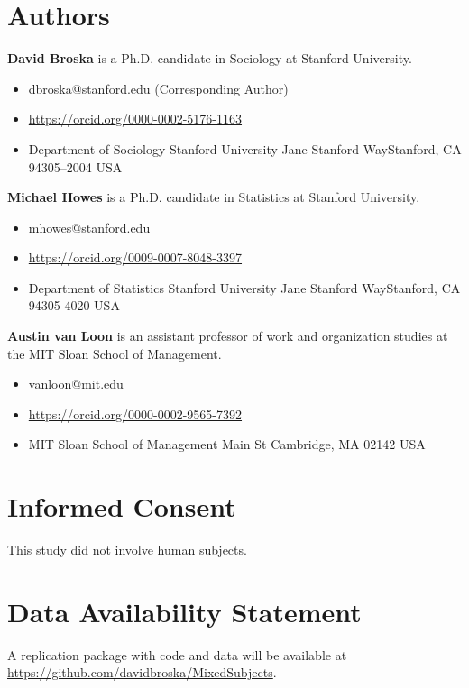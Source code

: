 \documentclass{article}
\title{\mytitle}
\date{\mydate}
\author{}
\begin{document}
\maketitle


\myabstract

\newline 

\section*{Authors}

\textbf{David Broska} is a Ph.D. candidate in Sociology at Stanford University.

\begin{itemize}
    \item dbroska@stanford.edu (Corresponding Author)
    \item \url{https://orcid.org/0000-0002-5176-1163}
    \item Department of Sociology \newline Stanford University  Jane Stanford Way\newline Stanford, CA 94305–2004 USA
\end{itemize}

\textbf{Michael Howes} is a Ph.D. candidate in Statistics at Stanford University. 

\begin{itemize}
    \item mhowes@stanford.edu
    \item \url{https://orcid.org/0009-0007-8048-3397}
    \item Department of Statistics \newline Stanford University  Jane Stanford Way\newline Stanford, CA 94305-4020 USA
\end{itemize}

\textbf{Austin van Loon} is an assistant professor of work and organization studies at the MIT Sloan School of Management.
\begin{itemize}
    \item vanloon@mit.edu
    \item \url{https://orcid.org/0000-0002-9565-7392}
    \item MIT Sloan School of Management Main St \newline Cambridge, MA 02142 USA 
\end{itemize}

\section*{Informed Consent}

This study did not involve human subjects.

\section*{Data Availability Statement}

A replication package with code and data will be available at \url{https://github.com/davidbroska/MixedSubjects}.
\end{document}
